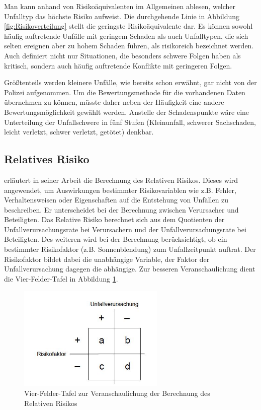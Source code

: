 Man kann anhand von Risikoäquivalenten im Allgemeinen ablesen, welcher Unfalltyp das höchste Risiko aufweist. Die durchgehende Linie in Abbildung \ref{fig:Risikoverteilung} stellt die geringste Risikoäquivalente dar. Es können sowohl häufig auftretende Unfälle mit geringem Schaden als auch Unfalltypen, die sich selten ereignen aber zu hohem Schaden führen, als risikoreich bezeichnet werden. Auch \Textcite[S. 14]{Mages.2008} definiert nicht nur Situationen, die besonders schwere Folgen haben als kritisch, sondern auch häufig auftretende Konflikte mit geringeren Folgen.

Größtenteils werden kleinere Unfälle, wie bereits schon erwähnt, gar nicht von der Polizei aufgenommen. Um die Bewertungsmethode für die vorhandenen Daten übernehmen zu können, müsste daher neben der Häufigkeit eine andere Bewertungsmöglichkeit gewählt werden. Anstelle der Schadenspunkte wäre eine Unterteilung der Unfallschwere in fünf Stufen (Kleinunfall, schwerer Sachschaden, leicht verletzt, schwer verletzt, getötet) denkbar.

\subsection{Relatives Risiko}
\Textcite[S. 112f]{Grundl.2005} erläutert in seiner Arbeit die Berechnung des Relativen Risikos. Dieses wird angewendet, um Auswirkungen bestimmter Risikovariablen wie z.B. Fehler, Verhaltensweisen oder Eigenschaften auf die Entstehung von Unfällen zu beschreiben. Er unterscheidet bei der Berechnung zwischen Verursacher und Beteiligten. Das Relative Risiko berechnet sich aus dem Quotienten der Unfallverursachungsrate bei Verursachern und der Unfallverursachungsrate bei Beteiligten. %
Des weiteren wird bei der Berechnung berücksichtigt, ob ein bestimmter Risikofaktor (z.B. Sonnenblendung) zum Unfallzeitpunkt auftrat. Der Risikofaktor bildet dabei die unabhängige Variable, der Faktor der Unfallverursachung dagegen die abhängige. Zur besseren Veranschaulichung dient die Vier-Felder-Tafel in Abbildung \ref{fig:Relatives Risiko}. 

\begin{savenotes}
	\begin{figure}[H]
		\centering
		\includegraphics[width=7cm,height=5cm]{figures/Relatives_Risiko}
		\caption[Vier-Felder-Tafel zur Veranschaulichung der Berechnung des Relativen Risikos]{Vier-Felder-Tafel zur Veranschaulichung der Berechnung des Relativen Risikos \parencite[S. 113]{Grundl.2005}}\label{fig:Relatives Risiko}
	\end{figure}
\end{savenotes}

